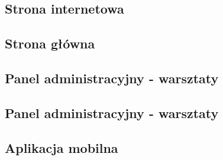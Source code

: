 \subsection{Strona internetowa}
\subsection{Strona główna}
\subsection{Panel administracyjny - warsztaty}
\subsection{Panel administracyjny - warsztaty}
\subsection{Aplikacja mobilna}